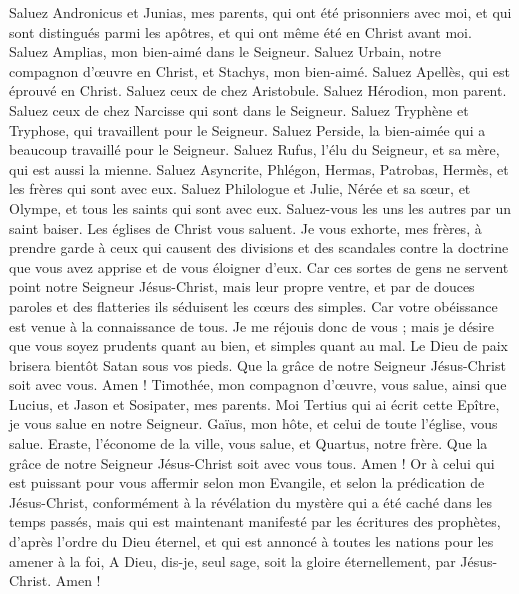 \begin{multicols}{2}
Saluez Andronicus et Junias, mes parents, qui ont été prisonniers avec moi, et qui sont distingués parmi les apôtres, et qui ont même été en Christ avant moi.
Saluez Amplias, mon bien-aimé dans le Seigneur.
Saluez Urbain, notre compagnon d'œuvre en Christ, et Stachys, mon bien-aimé.
Saluez Apellès, qui est éprouvé en Christ. Saluez ceux de chez Aristobule.
Saluez Hérodion, mon parent. Saluez ceux de chez Narcisse qui sont dans le Seigneur.
Saluez Tryphène et Tryphose, qui travaillent pour le Seigneur. Saluez Perside, la bien-aimée qui a beaucoup travaillé pour le Seigneur.
Saluez Rufus, l'élu du Seigneur, et sa mère, qui est aussi la mienne.
Saluez Asyncrite, Phlégon, Hermas, Patrobas, Hermès, et les frères qui sont avec eux.
Saluez Philologue et Julie, Nérée et sa sœur, et Olympe, et tous les saints qui sont avec eux.
Saluez-vous les uns les autres par un saint baiser. Les églises de Christ vous saluent.
Je vous exhorte, mes frères, à prendre garde à ceux qui causent des divisions et des scandales contre la doctrine que vous avez apprise et de vous éloigner d'eux.
Car ces sortes de gens ne servent point notre Seigneur Jésus-Christ, mais leur propre ventre, et par de douces paroles et des flatteries ils séduisent les cœurs des simples.
Car votre obéissance est venue à la connaissance de tous. Je me réjouis donc de vous ; mais je désire que vous soyez prudents quant au bien, et simples quant au mal.
Le Dieu de paix brisera bientôt Satan sous vos pieds. Que la grâce de notre Seigneur Jésus-Christ soit avec vous. Amen !
Timothée, mon compagnon d'œuvre, vous salue, ainsi que Lucius, et Jason et Sosipater, mes parents.
Moi Tertius qui ai écrit cette Epître, je vous salue en notre Seigneur.
Gaïus, mon hôte, et celui de toute l'église, vous salue. Eraste, l'économe de la ville, vous salue, et Quartus, notre frère.
Que la grâce de notre Seigneur Jésus-Christ soit avec vous tous. Amen !
Or à celui qui est puissant pour vous affermir selon mon Evangile, et selon la prédication de Jésus-Christ, conformément à la révélation du mystère qui a été caché dans les temps passés,
mais qui est maintenant manifesté par les écritures des prophètes, d'après l'ordre du Dieu éternel, et qui est annoncé à toutes les nations pour les amener à la foi,
A Dieu, dis-je, seul sage, soit la gloire éternellement, par Jésus-Christ. Amen !
\PPE{}
\end{multicols}
